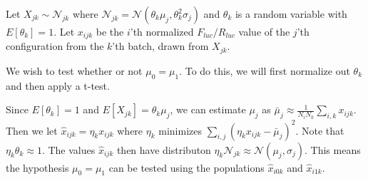 \documentclass[12pt]{scrartcl}
\begin{document}
Let $X_{jk} \sim \mathcal{N}_{jk}$ where
$\mathcal{N}_{jk} = \mathcal{N}(\theta_k\mu_j,\theta_k^2\sigma_j)$
and $\theta_k$ is a random variable with $E[\theta_k] = 1$.
Let $x_{ijk}$ be the $i$'th normalized $F_{luc}/R_{luc}$ value of the $j$'th
configuration from the $k$'th batch, drawn from $X_{jk}$.

We wish to test whether or not $\mu_0 = \mu_1$. To do this, we will first
normalize out $\theta_k$ and then apply a t-test.

Since $E[\theta_k] = 1$ and $E[X_{jk}] = \theta_k\mu_j$, we can estimate
$\mu_j$ as $\bar{\mu}_j \approx \frac{1}{N_iN_k}\sum_{i,k}x_{ijk}$. Then we 
let $\hat{x}_{ijk} = \eta_k x_{ijk}$ where $\eta_k$
minimizes $\sum_{i,j} (\eta_k x_{ijk} - \bar{\mu}_j)^2$. Note that
$\eta_k \theta_k \approx 1$.
The values $\hat{x}_{ijk}$ then have distributon
$\eta_k \mathcal{N}_{jk} \approx \mathcal{N}(\mu_j, \sigma_j)$. This means
the hypothesis $\mu_0 = \mu_1$ can be tested using the populations
$\hat{x}_{i0k}$ and $\hat{x}_{i1k}$.
\end{document}
